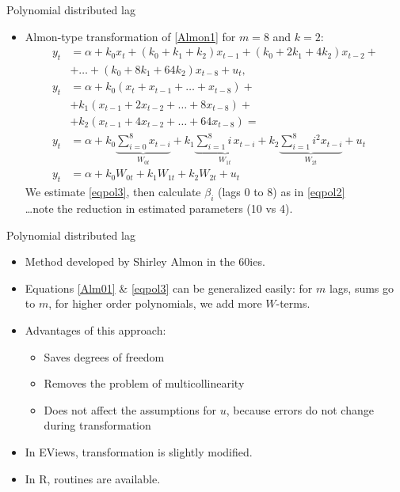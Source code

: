 \documentclass{beamer}
\begin{document}
\begin{frame}{Polynomial distributed lag}
\begin{itemize}
\item Almon-type transformation of \eqref{Almon1} for $m=8$ and $k=2$:
\begin{align} \nonumber
y_t & =  \alpha + k_0 x_t + (k_0 + k_1 + k_2)x_{t-1} + (k_0 + 2k_1 + 4k_2)x_{t-2} + \\ & + \dots + (k_0 + 8k_1 + 64k_2)x_{t-8}+u_t, \\ \nonumber
y_t & = \alpha + k_0 (x_t + x_{t-1} + \dots + x_{t-8}) + \\ \nonumber & +  k_1(x_{t-1} + 2 x_{t-2} + \dots + 8 x_{t-8}) + \\ \nonumber & + k_2(x_{t-1} + 4x_{t-2} + \dots + 64x_{t-8}) = \\ 
y_t & = \alpha + k_0 \underbrace{\sum_{i=0}^8 x_{t-i}}_{W_{0t}} + k_1 \underbrace{\sum_{i=1}^8 i\, x_{t-i}}_{W_{1t}}  + k_2 \underbrace{\sum_{i=1}^8 i^2 x_{t-i}}_{W_{2t}}  + u_t \label{Alm01}\\
y_t & = \alpha + k_0 W_{0t} + k_1 W_{1t} + k_2 W_{2t} + u_t \label{eqpol3}
\end{align}
We estimate \eqref{eqpol3}, then calculate $\beta_i$ (lags 0 to 8) as in \eqref{eqpol2}\\
\dots note the reduction in estimated parameters (10 vs 4).
\end{itemize}
\end{frame}
\begin{frame}{Polynomial distributed lag}
\begin{itemize}
\item Method developed by Shirley Almon in the 60ies.
\item Equations \eqref{Alm01}  \& \eqref{eqpol3} can be generalized easily: for $m$ lags, sums go to $m$, for higher order polynomials, we add more $W$-terms.
\vspace{0.3cm}
\item Advantages of this approach:
\begin{itemize}
\item Saves degrees of freedom
 \item Removes the problem of multicollinearity
 \item Does not affect the assumptions for $u$, because errors do not change during transformation
\end{itemize}
\vspace{0.3cm}
\item In EViews, transformation is slightly modified.
\item In R, routines are available.
\end{itemize}
\end{frame}
\end{document}
